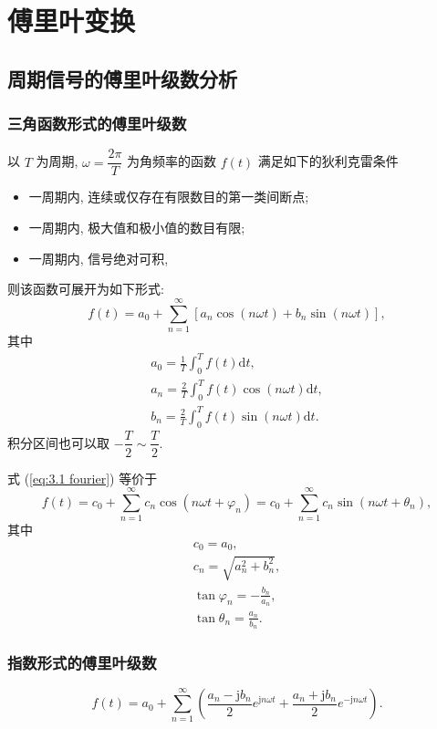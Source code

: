 \section{傅里叶变换} \label{傅里叶变换}
\subsection{周期信号的傅里叶级数分析} \label{3 周期信号的傅里叶级数分析}
\subsubsection{三角函数形式的傅里叶级数}
以 $T$ 为周期, $\omega=\dfrac{2\pi}{T}$ 为角频率的函数 $f(t)$ 满足如下的狄利克雷条件
\begin{itemize}
    \item 一周期内, 连续或仅存在有限数目的第一类间断点;
    \item 一周期内, 极大值和极小值的数目有限;
    \item 一周期内, 信号绝对可积,
\end{itemize}
则该函数可展开为如下形式:
\begin{equation} \label{eq:3.1 fourier}
    f(t)=a_0+\sum_{n=1}^{\infty}[a_n\cos(n\omega t)+b_n\sin(n\omega t)],
\end{equation}
其中
\begin{gather}
    a_0=\frac{1}{T}\int_{0}^{T}f(t)\mathrm{d}t, \\
    a_n=\frac{2}{T}\int_{0}^{T}f(t)\cos(n\omega t)\mathrm{d}t, \\
    b_n=\frac{2}{T}\int_{0}^{T}f(t)\sin(n\omega t)\mathrm{d}t.
\end{gather}
积分区间也可以取 $-\dfrac{T}{2}\sim\dfrac{T}{2}$.

式 (\ref{eq:3.1 fourier}) 等价于
\begin{equation}
    f(t)=c_0+\sum_{n=1}^{\infty}c_n\cos(n\omega t+\varphi_n)=c_0+\sum_{n=1}^{\infty}c_n\sin(n\omega t+\theta_n),
\end{equation}
其中
\begin{gather}
    c_0=a_0, \\
    c_n=\sqrt{a_n^2+b_n^2}, \\
    \tan\varphi_n=-\frac{b_n}{a_n}, \\
    \tan\theta_n=\frac{a_n}{b_n}.
\end{gather}

\subsubsection{指数形式的傅里叶级数}
\rmg
\begin{equation} \label{eq:3.1 fourier exponential}
    f(t)=a_0+\sum_{n=1}^{\infty}\left(\frac{a_n-\mathrm{j}b_n}{2}e^{\mathrm{j}n\omega t}+\frac{a_n+\mathrm{j}b_n}{2}e^{-\mathrm{j}n\omega t}\right).
\end{equation}

